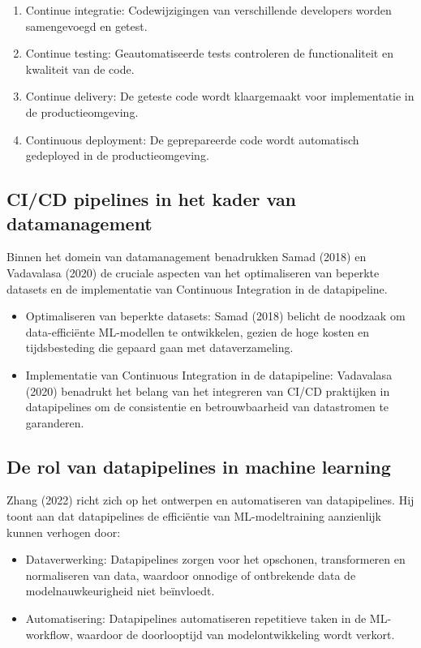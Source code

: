 \begin{enumerate}[label=\arabic*.]
    \item Continue integratie: Codewijzigingen van verschillende developers worden samengevoegd en getest.
    \item Continue testing: Geautomatiseerde tests controleren de functionaliteit en kwaliteit van de code.
    \item Continue delivery: De geteste code wordt klaargemaakt voor implementatie in de productieomgeving.
    \item Continuous deployment: De geprepareerde code wordt automatisch gedeployed in de productieomgeving.
\end{enumerate}

\subsection{CI/CD pipelines in het kader van datamanagement}

Binnen het domein van datamanagement benadrukken Samad (2018) en Vadavalasa (2020) de cruciale aspecten van het optimaliseren van beperkte datasets en de implementatie van Continuous Integration in de datapipeline.

\begin{itemize}
    \item Optimaliseren van beperkte datasets: Samad (2018) belicht de noodzaak om data-efficiënte ML-modellen te ontwikkelen, gezien de hoge kosten en tijdsbesteding die gepaard gaan met dataverzameling.
    \item Implementatie van Continuous Integration in de datapipeline: Vadavalasa (2020) benadrukt het belang van het integreren van CI/CD praktijken in datapipelines om de consistentie en betrouwbaarheid van datastromen te garanderen.
\end{itemize}

\subsection{De rol van datapipelines in machine learning}

Zhang (2022) richt zich op het ontwerpen en automatiseren van datapipelines. Hij toont aan dat datapipelines de efficiëntie van ML-modeltraining aanzienlijk kunnen verhogen door:

\begin{itemize}
    \item Dataverwerking: Datapipelines zorgen voor het opschonen, transformeren en normaliseren van data, waardoor onnodige of ontbrekende data de modelnauwkeurigheid niet beïnvloedt.
    \item Automatisering: Datapipelines automatiseren repetitieve taken in de ML-workflow, waardoor de doorlooptijd van modelontwikkeling wordt verkort.
\end{itemize}

